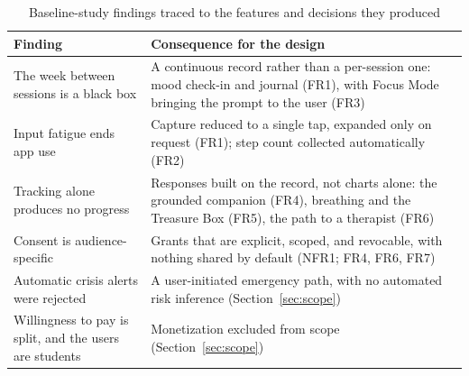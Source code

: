 \begin{table}[htbp]
  \centering
  \small
  \caption{Baseline-study findings traced to the features and decisions they produced}
  \label{tab:baseline-traceability}
  \begin{tabular}{|L{4.4cm}|L{9.4cm}|}
    \hline
    \textbf{Finding} & \textbf{Consequence for the design} \\
    \hline
    The week between sessions is a black box & A continuous record rather than a per-session one: mood check-in and journal (FR1), with Focus Mode bringing the prompt to the user (FR3) \\
    \hline
    Input fatigue ends app use & Capture reduced to a single tap, expanded only on request (FR1); step count collected automatically (FR2) \\
    \hline
    Tracking alone produces no progress & Responses built on the record, not charts alone: the grounded companion (FR4), breathing and the Treasure Box (FR5), the path to a therapist (FR6) \\
    \hline
    Consent is audience-specific & Grants that are explicit, scoped, and revocable, with nothing shared by default (NFR1; FR4, FR6, FR7) \\
    \hline
    Automatic crisis alerts were rejected & A user-initiated emergency path, with no automated risk inference (Section~\ref{sec:scope}) \\
    \hline
    Willingness to pay is split, and the users are students & Monetization excluded from scope (Section~\ref{sec:scope}) \\
    \hline
  \end{tabular}
\end{table}
